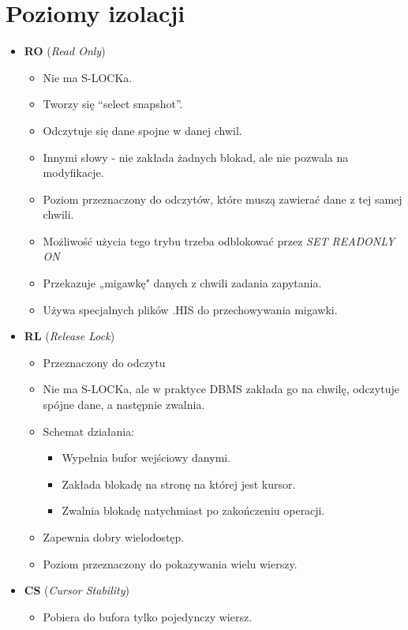 \documentclass[a4paper,twoside]{article}
\begin{document}
  	\section*{Poziomy izolacji}
  	\begin{itemize}
  		\item \textbf{RO} (\emph{Read Only})
  		\begin{itemize}
  			\item Nie ma S-LOCKa.
  			\item Tworzy się “select snapshot”.
  			\item Odczytuje się dane spojne w danej chwil.
  			\item Innymi słowy - nie zakłada żadnych blokad, ale nie pozwala na modyfikacje.
  			\item Poziom przeznaczony do odczytów, które muszą zawierać dane z tej samej chwili.
  			\item Możliwość użycia tego trybu trzeba odblokować przez \emph{SET READONLY ON}
  			\item Przekazuje „migawkę" danych z chwili zadania zapytania.
  			\item Używa specjalnych plików .HIS do przechowywania migawki.
  		\end{itemize}
  		\item \textbf{RL} (\emph{Release Lock})
  		\begin{itemize}
  			\item Przeznaczony do odczytu
  			\item Nie ma S-LOCKa, ale w praktyce DBMS zakłada go na chwilę, odczytuje spójne dane, a następnie zwalnia.
  			\item Schemat działania:
  			\begin{itemize}
  				\item Wypełnia bufor wejściowy danymi.
  				\item Zakłada blokadę na stronę na której jest kursor.
  				\item Zwalnia blokadę natychmiast po zakończeniu operacji.
  			\end{itemize}
  			\item Zapewnia dobry wielodostęp.
  			\item Poziom przeznaczony do pokazywania wielu wierszy.
  		\end{itemize}
  		\item \textbf{CS} (\emph{Cursor Stability})
  		\begin{itemize}
  			\item Pobiera do bufora tylko pojedynczy wiersz.

\end{itemize}
\end{itemize}
\end{document}
